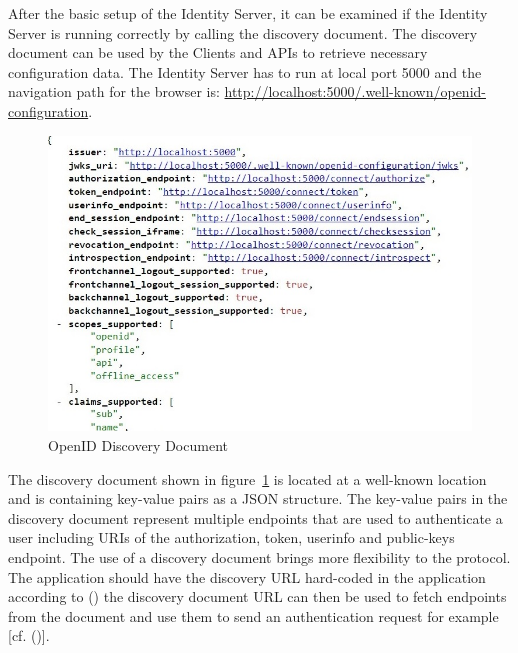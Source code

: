 After the basic setup of the Identity Server, it can be examined if the Identity Server is running correctly by calling the discovery document. The discovery document can be used by the Clients and APIs to retrieve necessary configuration data. The Identity Server has to run at local port 5000 and the navigation path for the browser is:
\url{http://localhost:5000/.well-known/openid-configuration}.

\begin{figure}[h]
	\centering
	\includegraphics[width=0.8\linewidth]{images/openid-discovery-document}
	\caption{OpenID Discovery Document}
	\label{fig:openid-discovery-document}
\end{figure}
The discovery document shown in figure~\ref{fig:openid-discovery-document} is located at a well-known location and is containing key-value pairs as a JSON structure. The key-value pairs in the discovery document represent multiple endpoints that are used to authenticate a user including URIs of the authorization, token, userinfo and public-keys endpoint. The use of a discovery document brings more flexibility to the protocol. The application should have the discovery URL hard-coded in the application according to (\cite{Google:2018:IdentityPlatform}) the discovery document URL can then be used to fetch endpoints from the document and use them to send an authentication request for example [cf. (\cite{Google:2018:IdentityPlatform})].

